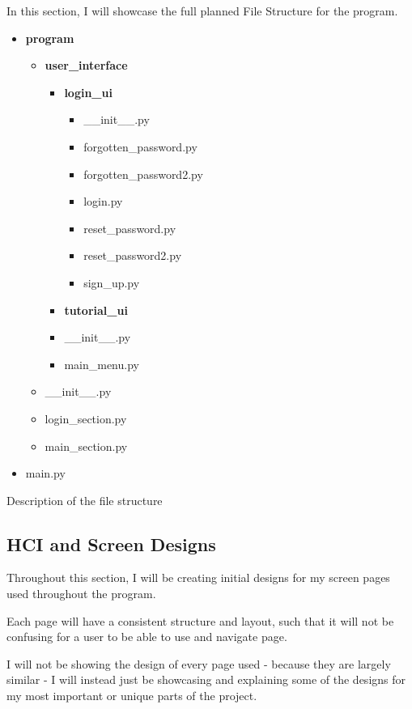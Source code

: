 \documentclass{article}
\begin{document}
In this section, I will showcase the full planned File Structure for the program.

\begin{itemize}
    \item \textbf{program}
    \begin{itemize}
        \item \textbf{user\_interface}
        \begin{itemize}
            \item \textbf{login\_ui}
            \begin{itemize}
                \item \_\_init\_\_.py
                \item forgotten\_password.py
                \item forgotten\_password2.py
                \item login.py
                \item reset\_password.py
                \item reset\_password2.py
                \item sign\_up.py
            \end{itemize}
            \item \textbf{tutorial\_ui}
            \item \_\_init\_\_.py
            \item main\_menu.py
        \end{itemize}
        \item \_\_init\_\_.py
        \item login\_section.py
        \item main\_section.py
    \end{itemize}
    \item main.py
\end{itemize}

Description of the file structure

\clearpage

\subsection{HCI and Screen Designs}
Throughout this section, I will be creating initial designs for my screen pages used throughout the program.

Each page will have a consistent structure and layout, such that it will not be confusing for a user to be able to use and navigate page.

I will not be showing the design of every page used - because they are largely similar - I will instead just be showcasing and explaining some of the designs for my most important or unique parts of the project.
\end{document}
